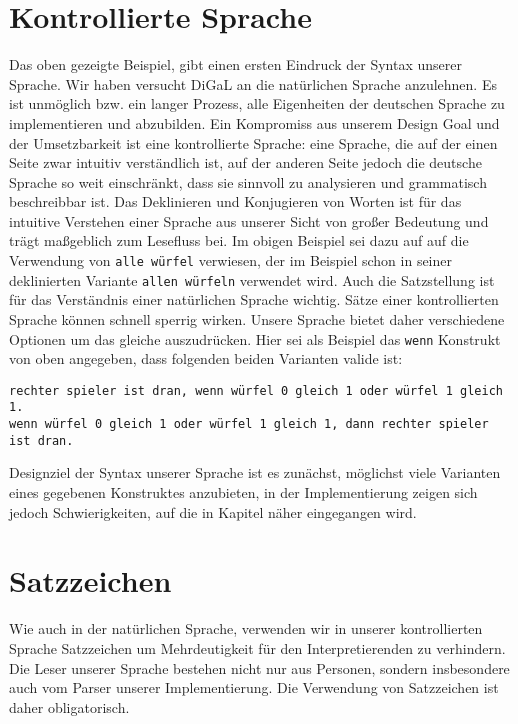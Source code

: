 	\section{Kontrollierte Sprache}
	\label{sec:kontrollierte_sprache}
		Das oben gezeigte Beispiel, gibt einen ersten Eindruck der Syntax unserer Sprache. 
        Wir haben versucht DiGaL an die natürlichen Sprache anzulehnen. Es ist unmöglich bzw. ein langer Prozess, alle Eigenheiten der deutschen Sprache zu implementieren und abzubilden. Ein Kompromiss aus unserem Design Goal und der Umsetzbarkeit ist eine kontrollierte Sprache: eine Sprache, die auf der einen Seite zwar intuitiv verständlich ist, auf der anderen Seite jedoch die deutsche Sprache so weit einschränkt, dass sie sinnvoll zu analysieren und grammatisch beschreibbar ist. 
        Das Deklinieren und Konjugieren von Worten ist für das intuitive Verstehen einer Sprache aus unserer Sicht von großer Bedeutung und trägt maßgeblich zum Lesefluss bei. Im obigen Beispiel sei dazu auf auf die Verwendung von \texttt{alle würfel} verwiesen, der im Beispiel schon in seiner deklinierten Variante \texttt{allen würfeln} verwendet wird.
        Auch die Satzstellung ist für das Verständnis einer natürlichen Sprache wichtig. Sätze einer kontrollierten Sprache können schnell sperrig wirken. Unsere Sprache bietet daher verschiedene Optionen um das gleiche auszudrücken. Hier sei als Beispiel das \texttt{wenn} Konstrukt von oben angegeben, dass folgenden beiden Varianten valide ist:
\begin{lstlisting}
rechter spieler ist dran, wenn würfel 0 gleich 1 oder würfel 1 gleich 1.
wenn würfel 0 gleich 1 oder würfel 1 gleich 1, dann rechter spieler ist dran.
\end{lstlisting}
        Designziel der Syntax unserer Sprache ist es zunächst, möglichst viele Varianten eines gegebenen Konstruktes anzubieten, in der Implementierung zeigen sich jedoch Schwierigkeiten, auf die in Kapitel  näher eingegangen wird.
        
    \section{Satzzeichen} %
    \label{sec:satzzeichen}
        Wie auch in der natürlichen Sprache, verwenden wir in unserer kontrollierten Sprache Satzzeichen um Mehrdeutigkeit für den Interpretierenden zu verhindern. Die Leser unserer Sprache bestehen nicht nur aus Personen, sondern insbesondere auch vom Parser unserer Implementierung. Die Verwendung von Satzzeichen ist daher obligatorisch.
